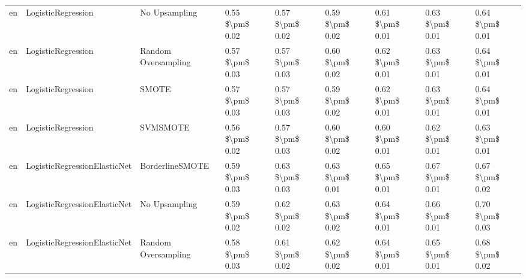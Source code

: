 \begin{tabular}{lllllllll}
      en &              LogisticRegression &                 No Upsampling &     0.55 \$\textbackslash pm\$ 0.02 &           0.57 \$\textbackslash pm\$ 0.02 &       0.59 \$\textbackslash pm\$ 0.02 &        0.61 \$\textbackslash pm\$ 0.01 &                         0.63 \$\textbackslash pm\$ 0.01 &     0.64 \$\textbackslash pm\$ 0.01 \\
      en &              LogisticRegression &           Random Oversampling &     0.57 \$\textbackslash pm\$ 0.03 &           0.57 \$\textbackslash pm\$ 0.03 &       0.60 \$\textbackslash pm\$ 0.02 &        0.62 \$\textbackslash pm\$ 0.01 &                         0.63 \$\textbackslash pm\$ 0.01 &     0.64 \$\textbackslash pm\$ 0.01 \\
      en &              LogisticRegression &                         SMOTE &     0.57 \$\textbackslash pm\$ 0.03 &           0.57 \$\textbackslash pm\$ 0.03 &       0.59 \$\textbackslash pm\$ 0.02 &        0.62 \$\textbackslash pm\$ 0.01 &                         0.63 \$\textbackslash pm\$ 0.01 &     0.64 \$\textbackslash pm\$ 0.01 \\
      en &              LogisticRegression &                      SVMSMOTE &     0.56 \$\textbackslash pm\$ 0.02 &           0.57 \$\textbackslash pm\$ 0.03 &       0.60 \$\textbackslash pm\$ 0.02 &        0.60 \$\textbackslash pm\$ 0.01 &                         0.62 \$\textbackslash pm\$ 0.01 &     0.63 \$\textbackslash pm\$ 0.01 \\
      en &    LogisticRegressionElasticNet &               BorderlineSMOTE &     0.59 \$\textbackslash pm\$ 0.03 &           0.63 \$\textbackslash pm\$ 0.03 &       0.63 \$\textbackslash pm\$ 0.01 &        0.65 \$\textbackslash pm\$ 0.01 &                         0.67 \$\textbackslash pm\$ 0.01 &     0.67 \$\textbackslash pm\$ 0.02 \\
      en &    LogisticRegressionElasticNet &                 No Upsampling &     0.59 \$\textbackslash pm\$ 0.02 &           0.62 \$\textbackslash pm\$ 0.02 &       0.63 \$\textbackslash pm\$ 0.02 &        0.64 \$\textbackslash pm\$ 0.01 &                         0.66 \$\textbackslash pm\$ 0.01 &     0.70 \$\textbackslash pm\$ 0.03 \\
      en &    LogisticRegressionElasticNet &           Random Oversampling &     0.58 \$\textbackslash pm\$ 0.03 &           0.61 \$\textbackslash pm\$ 0.02 &       0.62 \$\textbackslash pm\$ 0.02 &        0.64 \$\textbackslash pm\$ 0.01 &                         0.65 \$\textbackslash pm\$ 0.01 &     0.68 \$\textbackslash pm\$ 0.02 \\

\end{tabular}
